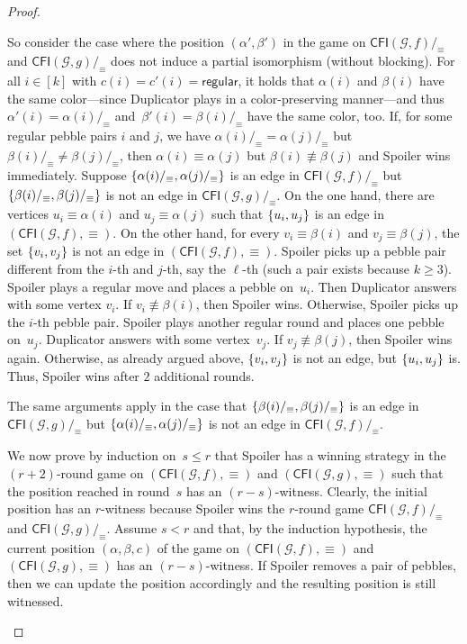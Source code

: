 \documentclass[10pt,a4paper]{article}
\DeclarePairedDelimiter\set{\lbrace}{\rbrace}
\newcommand{\regular}{\mathsf{regular}}
\newcommand{\comp}{\equiv}
\newcommand{\CFIsym}{\mathsf{CFI}}
\newcommand{\CFI}[1]{\CFIsym(#1)}
\newcommand{\compCFI}[2]{\CFI{#1}/_{#2}}
\newcommand{\precompCFI}[2]{{(\CFI{#1},#2)}}
\newcommand{\graphG}{\mathcal{G}}
\begin{document}
\begin{proof}
\begin{enumerate}
        So consider the case where the position $(\alpha',\beta')$ in the game on $\compCFI{\graphG,f}{\comp}$ and $\compCFI{\graphG,g}{\comp}$ does not induce a partial isomorphism (without blocking). 
        For all $i \in [k]$ with $c(i)=c'(i) = \regular$,
        it holds that $\alpha(i)$ and $\beta(i)$ have the same color---since Duplicator plays in a color-preserving manner---and thus $\alpha'(i) = \alpha(i)/_\comp$ and~$\beta'(i) = \beta(i)/_\comp$ have the same color, too.
        If, for some regular pebble pairs $i$ and $j$, we have $\alpha(i)/_\comp=\alpha(j)/_\comp$ but $\beta(i)/_\comp\neq \beta(j)/_\comp$,
        then  $\alpha(i) \comp \alpha(j)$ but
        $\beta(i) \not\comp \beta(j)$ and Spoiler wins immediately.
        Suppose $\set{\alpha(i)/_\comp, \alpha(j)/_\comp}$ is an edge in $\compCFI{\graphG,f}{\comp}$
        but $\set{\beta(i)/_\comp, \beta(j)/_\comp}$ is not an edge in $\compCFI{\graphG,g}{\comp}$.
On the one hand, there are vertices $u_i\comp \alpha(i)$ and $u_j\comp \alpha(j)$
        such that $\set{u_i,u_j}$ is an edge in $\precompCFI{\graphG,f}{\comp}$.
        On the other hand, for every $v_i\comp \beta(i)$ and $v_j\comp \beta(j)$,
        the set $\set{v_i,v_j}$ is not an edge in $\precompCFI{\graphG,f}{\comp}$.
        Spoiler picks up a pebble pair different from the $i$-th and $j$-th,
        say the $\ell$-th
        (such a pair exists because $k \geq 3$).
        Spoiler plays a regular move and places a pebble on~$u_i$.
        Then Duplicator answers with some vertex $v_i$.
        If $v_i \not \comp \beta(i)$, then Spoiler wins.
        Otherwise, Spoiler picks up the $i$-th pebble pair.
        Spoiler plays another regular round and
        places one pebble on~$u_j$.
        Duplicator answers with some vertex~$v_j$.
        If $v_j \not \comp \beta(j)$,
        then Spoiler wins again.
        Otherwise, as already argued above, $\set{v_i,v_j}$ is not an edge, but $\set{u_i,u_j}$ is.
        Thus, Spoiler wins after $2$ additional rounds.
        
        The same arguments apply in the case that $\set{\beta(i)/_\comp, \beta(j)/_\comp}$  is an edge in $\compCFI{\graphG,g}{\comp}$
        but  $\set{\alpha(i)/_\comp, \alpha(j)/_\comp}$ is not an edge in  $\compCFI{\graphG,f}{\comp}$.
        
        We now prove by induction on~$s\leq r$ that Spoiler has a winning strategy
        in the ${(r+2)}$\nobreakdash-round game on $\precompCFI{\graphG,f}{\comp}$ and $\precompCFI{\graphG,g}{\comp}$ such that the position reached in round~$s$ 
        has an $(r-s)$-witness.
        Clearly, the initial position has an $r$\nobreakdash-witness because
        Spoiler wins the $r$\nobreakdash-round game $\compCFI{\graphG,f}{\comp}$ and $\compCFI{\graphG,g}{\comp}$. Assume $s < r$ and that, by the induction hypothesis,
        the current position $(\alpha,\beta,c)$
        of the game on $\precompCFI{\graphG,f}{\comp}$ and $\precompCFI{\graphG,g}{\comp}$
        has an $(r-s)$\nobreakdash-witness.
        If Spoiler removes a pair of pebbles, then we can update the position accordingly and the resulting position is still witnessed.
        

\end{enumerate}
\end{proof}
\end{document}
